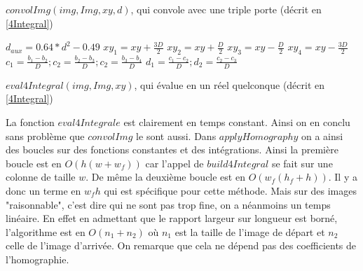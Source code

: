 
 
 
  \begin{algorithm}[H]
 \caption{$convolImg(img,Img,xy,d)$, qui convole avec une triple porte (décrit en \ref{4Integral})}
 $d_{aux} = 0.64 * d^{2} - 0.49$\;
 $xy_{1}  = xy + \frac{3D}{2}$\; 
 $xy_{2}  = xy + \frac{D}{2}$\; 
 $xy_{3}  = xy - \frac{D}{2}$\; 
 $xy_{4}  = xy - \frac{3D}{2}$\;
 $c_1 = \frac{b_1 - b_2}{D}; c_2=\frac{b_2 - b_3}{D}; c_2=\frac{b_3 - b_4}{D}$\; 
 $d_1 = \frac{c_1 - c_2}{D}; d_2=\frac{c_2 - c_3}{D}$\; 
  \label{pseudo_code_convol_4_int}
 \end{algorithm}
 
 
 
  \begin{algorithm}[H]
 \caption{$eval4Integral(img,Img,xy)$, qui évalue en un réel quelconque (décrit en \ref{4Integral})}
  \label{pseudo_code_eval_4_int}
 \end{algorithm}






La fonction $eval4Integrale$ est clairement en temps constant. Ainsi on en conclu sans problème que $convolImg$ le sont aussi. Dans $applyHomography$ on a ainsi des boucles sur des fonctions constantes et des intégrations. Ainsi la première boucle est en $O(h(w+w_f))$ car l'appel de $build4Integral$ se fait sur une colonne de taille $w$. De même la deuxième boucle est en $O(w_f(h_f+h))$. Il y a donc un terme en $w_f h$ qui est spécifique pour cette méthode. Mais sur des images "raisonnable", c'est dire qui ne sont pas trop fine, on a néanmoins un temps linéaire.
\medbreak
En effet en admettant que le rapport largeur sur longueur est borné, l'algorithme est en $O(n_1+n_2)$ où $n_1$ est la taille de l'image de départ et $n_2$ celle de l'image d'arrivée. On remarque que cela ne dépend pas des coefficients de l'homographie.


